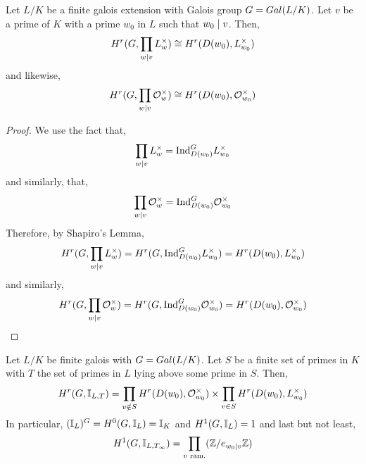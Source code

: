 \documentclass[12pt]{extarticle}
\begin{document}
\begin{lemma}
Let $L/K$ be a finite galois extension with Galois group $G = Gal \small(L/K \small)$. Let $v$ be a prime of $K$ with a prime $w_0$ in $L$ such that $w_0 \mid v$. Then,
\[ H^r(G, \prod_{w \mid v} L_w^\times) \cong H^r(D(w_0), L_{w_0}^\times) \] 
and likewise,
\[ H^r(G, \prod_{w \mid v} \mathcal{O}_{w}^\times) \cong H^r(D(w_0), \mathcal{O}_{w_0}^\times) \] 
\end{lemma} 

\begin{proof}
We use the fact that,
\[ \prod_{w \mid v} L_w^\times = \mathrm{Ind}^{G}_{D(w_0)} L_{w_0}^\times \]
and similarly, that,
\[ \prod_{w \mid v} \mathcal{O}_{w}^\times = \mathrm{Ind}^{G}_{D(w_0)} \mathcal{O}_{w_0}^\times \]
Therefore, by Shapiro’s Lemma,
\[ H^r(G, \prod_{w \mid v} L_w^\times) = H^r(G, \mathrm{Ind}^{G}_{D(w_0)} L_{w_0}^\times) = H^r(D(w_0), L_{w_0}^\times) \]
and similarly,
\[ H^r(G, \prod_{w \mid v} \mathcal{O}_{w}^\times) = H^r(G, \mathrm{Ind}^{G}_{D(w_0)} \mathcal{O}_{w_0}^\times) = H^r(D(w_0), \mathcal{O}_{w_0}^\times) \]
\end{proof}

\begin{lemma} \label{ramified_primes_decomp}
Let $L/K$ be finite galois with $G = Gal \small(L/K \small)$. Let $S$ be a finite set of primes in $K$ with $T$ the set of primes in $L$ lying above some prime in $S$. Then,
\[ H^r(G, \mathbb{I}_{L, T}) = \prod_{v \notin S} H^r(D(w_0), \mathcal{O}_{w_0}^\times) \times \prod_{v \in S} H^r(D(w_0), L_{w_0}^\times) \] 
In particular, $(\mathbb{I}_{L})^G = H^0(G, \mathbb{I}_{L}) = \mathbb{I}_{K}$ and $H^1(G, \mathbb{I}_{L}) = 1$ and last but not least,
\[ H^1(G, \mathbb{I}_{L, T_\infty}) = \prod_{v \text{ ram.}} (\mathbb{Z} / e_{w_0 | v} \mathbb{Z}) \]   
\end{lemma}
\end{document}
